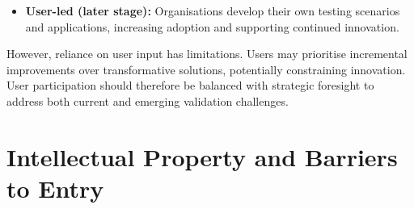 \documentclass[11pt, a4paper]{report}
\numberwithin{equation}{section}
\begin{document}
\begin{refsection}
\begin{itemize}
    \item \textbf{User-led (later stage):} Organisations develop their own testing scenarios and applications, increasing adoption and supporting continued innovation.

\end{itemize}

However, reliance on user input has limitations. Users may prioritise incremental improvements over transformative solutions, potentially constraining innovation. User participation should therefore be balanced with strategic foresight to address both current and emerging validation challenges.


\section{Intellectual Property and Barriers to Entry}


\end{refsection}
\end{document}
